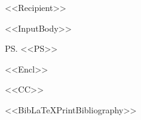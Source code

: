 \documentclass[%
<<DocumentClassOptions>>]{scrartcl}
\begin{document}
\begin{letter}{%
<<Recipient>>
}

<<InputBody>>

\ps
<<PS>>

<<Encl>>

<<CC>>

<<BibLaTeXPrintBibliography>>

\end{letter}
\end{document}

